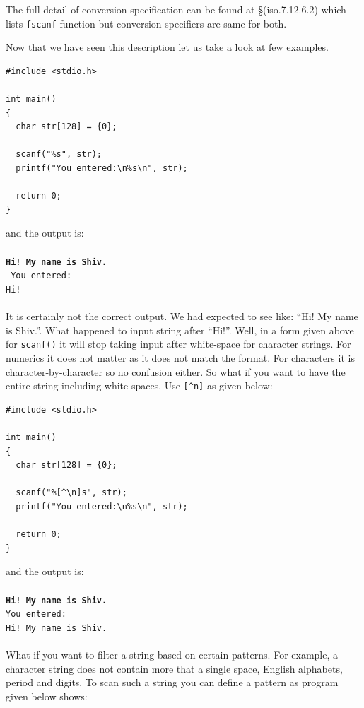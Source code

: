 The full detail of conversion specification can be found at \S(iso.7.12.6.2)
which lists \texttt{fscanf} function but conversion specifiers are same for
both.

Now that we have seen this description let us take a look at few examples.

\begin{verbatim}
#include <stdio.h>

int main()
{
  char str[128] = {0};

  scanf("%s", str);
  printf("You entered:\n%s\n", str);

  return 0;
}
\end{verbatim}

and the output is:
\\\\\texttt{\textbf{Hi! My name is Shiv.\\}
You entered:\\
Hi!\\\\}
It is certainly not the correct output. We had expected to see like: ``Hi! My
name is Shiv.''. What happened to input string after ``Hi!''. Well, in a form
given above for \texttt{scanf()} it will stop taking input after white-space
for character strings. For numerics it does not matter as it does not match the
format. For characters it is character-by-character so no confusion either. So
what if you want to have the entire string including white-spaces. Use
\texttt{[\^{}n]} as given below:

\begin{verbatim}
#include <stdio.h>

int main()
{
  char str[128] = {0};

  scanf("%[^\n]s", str);
  printf("You entered:\n%s\n", str);

  return 0;
}
\end{verbatim}

and the output is:
\\\\\texttt{\textbf{Hi! My name is Shiv.}\\
You entered:\\
Hi! My name is Shiv.\\\\}
What if you want to filter a string based on certain patterns. For example, a
character string does not contain more that a single space, English alphabets,
period and digits. To scan such a string you can define a pattern as program
given below shows:

